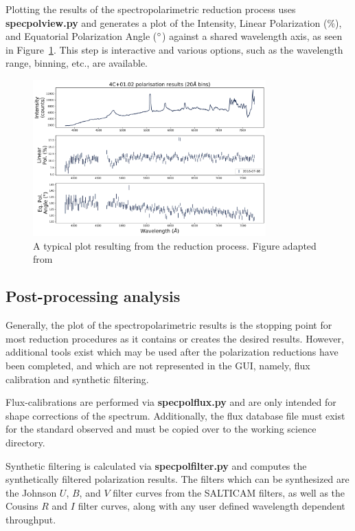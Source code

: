 Plotting the results of the spectropolarimetric reduction process uses \textbf{specpolview.py} and generates a plot of the Intensity, Linear Polarization ($\%$), and Equatorial Polarization Angle ($\hbox{$^\circ$}$) against a shared wavelength axis, as seen in Figure~\ref{fig:polsalt_plot}. This step is interactive and various options, such as the wavelength range, binning, etc., are available.

\begin{figure}[t]
    \centering
    \includegraphics[width = 0.8\textwidth]{figures/2_polsalt_plot.pdf}
    \caption{A typical plot resulting from the reduction process. Figure adapted from \citep{cooper_HEASA2022}}
    \label{fig:polsalt_plot}
\end{figure}

\subsection{Post-processing analysis}

Generally, the plot of the spectropolarimetric results is the stopping point for most reduction procedures as it contains or creates the desired results. However, additional tools exist which may be used after the polarization reductions have been completed, and which are not represented in the \gls{GUI}, namely, flux calibration and synthetic filtering.

Flux-calibrations are performed via \textbf{specpolflux.py} and are only intended for shape corrections of the spectrum. Additionally, the flux database file must exist for the standard observed and must be copied over to the working science directory.

Synthetic filtering is calculated via \textbf{specpolfilter.py} and computes the synthetically filtered polarization results. The filters which can be synthesized are the Johnson $U$, $B$, and $V$ filter curves from the \gls{SALTICAM} filters, as well as the Cousins $R$ and $I$ filter curves, along with any user defined wavelength dependent throughput.

